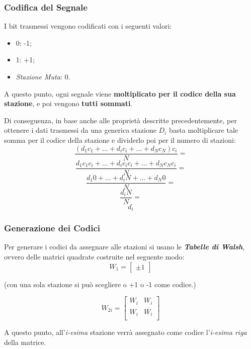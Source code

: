 \documentclass[a4paper]{article}
\begin{document}
		\subsubsection{Codifica del Segnale}
			
			I bit trasmessi vengono codificati con i seguenti valori:
				\begin{itemize}
					\item 0: -1;
					\item 1: +1;
					\item \emph{Stazione Muta}: 0.
				\end{itemize}
				
			A questo punto, ogni segnale viene \textbf{moltiplicato per il codice della sua stazione}, e poi vengono \textbf{tutti sommati}. 
			
			Di conseguenza, in base anche alle proprietà descritte precedentemente, per ottenere i dati trasmessi da una generica stazione $ D_{i} $ basta moltiplicare tale somma per il codice della stazione e dividerlo poi per il numero di stazioni:
			\[ \frac{(d_{1}c_{1} + \dots+ d_{i}c_{i} + \dots+ d_{N}c_{N})c_{i}}{N} = \]
			\[ \frac{d_{1}c_{1}c_{i} + \dots+ d_{i}c_{i}c_{i} + \dots+ d_{N}c_{N}c_{i}}{N} = \]
			\[ \frac{d_{1}0 + \dots+ d_{i}N + \dots+ d_{N}0}{N} = \]
			\[ \frac{d_{i}N}{N} = \]
			\[ d_{i} \]
			
		
		\subsubsection{Generazione dei Codici}
		
			Per generare i codici da assegnare alle stazioni si usano le \textbf{\emph{Tabelle di Walsh}}, ovvero delle matrici quadrate costruite nel seguente modo:
			\[ W_{1} = 
				\begin{bmatrix}
					\pm1
				\end{bmatrix} \]

			(con una sola stazione si può scegliere o +1 o -1 come codice.)
			
			\[ W_{2i} = 				
				\begin{bmatrix}
					W_{i} & W_{i} \\
					W_{i} & \overline{W_{i}} \\
				\end{bmatrix} \]
			
			A questo punto, all'\emph{i-esima} stazione verrà assegnato come codice l'\emph{i-esima riga} della matrice.
\end{document}
